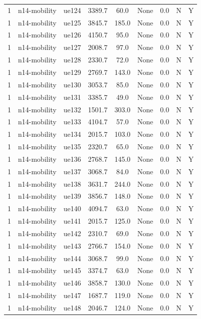 \begin{table}[ht]
\begin{tabular}{|c|c|c|c|c|c|c|c|c|}
1 & n14-mobility & ue124 & 3389.7 & 60.0 & None & 0.0 & N & Y \\
1 & n14-mobility & ue125 & 3845.7 & 185.0 & None & 0.0 & N & Y \\
1 & n14-mobility & ue126 & 4150.7 & 95.0 & None & 0.0 & N & Y \\
1 & n14-mobility & ue127 & 2008.7 & 97.0 & None & 0.0 & N & Y \\
1 & n14-mobility & ue128 & 2330.7 & 72.0 & None & 0.0 & N & Y \\
1 & n14-mobility & ue129 & 2769.7 & 143.0 & None & 0.0 & N & Y \\
1 & n14-mobility & ue130 & 3053.7 & 85.0 & None & 0.0 & N & Y \\
1 & n14-mobility & ue131 & 3385.7 & 49.0 & None & 0.0 & N & Y \\
1 & n14-mobility & ue132 & 1501.7 & 303.0 & None & 0.0 & N & Y \\
1 & n14-mobility & ue133 & 4104.7 & 57.0 & None & 0.0 & N & Y \\
1 & n14-mobility & ue134 & 2015.7 & 103.0 & None & 0.0 & N & Y \\
1 & n14-mobility & ue135 & 2320.7 & 65.0 & None & 0.0 & N & Y \\
1 & n14-mobility & ue136 & 2768.7 & 145.0 & None & 0.0 & N & Y \\
1 & n14-mobility & ue137 & 3068.7 & 84.0 & None & 0.0 & N & Y \\
1 & n14-mobility & ue138 & 3631.7 & 244.0 & None & 0.0 & N & Y \\
1 & n14-mobility & ue139 & 3856.7 & 148.0 & None & 0.0 & N & Y \\
1 & n14-mobility & ue140 & 4094.7 & 63.0 & None & 0.0 & N & Y \\
1 & n14-mobility & ue141 & 2015.7 & 125.0 & None & 0.0 & N & Y \\
1 & n14-mobility & ue142 & 2310.7 & 69.0 & None & 0.0 & N & Y \\
1 & n14-mobility & ue143 & 2766.7 & 154.0 & None & 0.0 & N & Y \\
1 & n14-mobility & ue144 & 3068.7 & 99.0 & None & 0.0 & N & Y \\
1 & n14-mobility & ue145 & 3374.7 & 63.0 & None & 0.0 & N & Y \\
1 & n14-mobility & ue146 & 3858.7 & 130.0 & None & 0.0 & N & Y \\
1 & n14-mobility & ue147 & 1687.7 & 119.0 & None & 0.0 & N & Y \\
1 & n14-mobility & ue148 & 2046.7 & 124.0 & None & 0.0 & N & Y \\

\end{tabular}
\end{table}
